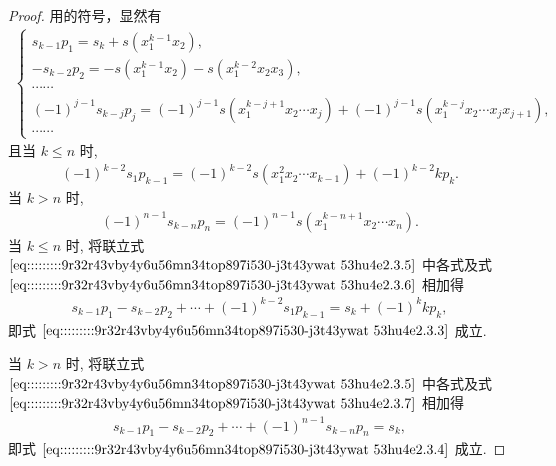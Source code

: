 \documentclass[../../main.tex]{subfiles}%
\begin{document}
\begin{proof}

用的符号，显然有
\begin{align}
\begin{cases}
s_{k-1} p_1 = s_k + s(x_1^{k-1} x_2), \\
-s_{k-2} p_2 = -s(x_1^{k-1} x_2) - s(x_1^{k-2} x_2 x_3), \\
\cdots\cdots \\
(-1)^{j-1} s_{k-j} p_j = (-1)^{j-1} s(x_1^{k-j+1} x_2 \cdots x_j) + (-1)^{j-1} s(x_1^{k-j} x_2 \cdots x_j x_{j+1}), \\
\cdots\cdots
\end{cases} \label{eq:::::::::9r32r43vby4y6u56mn34top897i530-j3t43ywat 53hu4e2.3.5}
\end{align}
且当 \( k \leqslant n \) 时,
\begin{align}
(-1)^{k-2} s_1 p_{k-1} = (-1)^{k-2} s(x_1^2 x_2 \cdots x_{k-1}) + (-1)^{k-2} k p_k. \label{eq:::::::::9r32r43vby4y6u56mn34top897i530-j3t43ywat 53hu4e2.3.6}
\end{align}
当 \( k > n \) 时,
\begin{align}
(-1)^{n-1} s_{k-n} p_n = (-1)^{n-1} s(x_1^{k-n+1} x_2 \cdots x_n). \label{eq:::::::::9r32r43vby4y6u56mn34top897i530-j3t43ywat 53hu4e2.3.7}
\end{align}
当 \( k \leqslant n \) 时, 将联立式 \(\eqref{eq:::::::::9r32r43vby4y6u56mn34top897i530-j3t43ywat 53hu4e2.3.5}\) 中各式及式 \(\eqref{eq:::::::::9r32r43vby4y6u56mn34top897i530-j3t43ywat 53hu4e2.3.6}\) 相加得
\begin{align*}
s_{k-1} p_1 - s_{k-2} p_2 + \cdots + (-1)^{k-2} s_1 p_{k-1} = s_k + (-1)^k k p_k,
\end{align*}
即式 \(\eqref{eq:::::::::9r32r43vby4y6u56mn34top897i530-j3t43ywat 53hu4e2.3.3}\) 成立.

当 \( k > n \) 时, 将联立式 \(\eqref{eq:::::::::9r32r43vby4y6u56mn34top897i530-j3t43ywat 53hu4e2.3.5}\) 中各式及式 \(\eqref{eq:::::::::9r32r43vby4y6u56mn34top897i530-j3t43ywat 53hu4e2.3.7}\) 相加得
\begin{align*}
s_{k-1} p_1 - s_{k-2} p_2 + \cdots + (-1)^{n-1} s_{k-n} p_n = s_k,
\end{align*}
即式 \(\eqref{eq:::::::::9r32r43vby4y6u56mn34top897i530-j3t43ywat 53hu4e2.3.4}\) 成立.

\end{proof}
\end{document}
